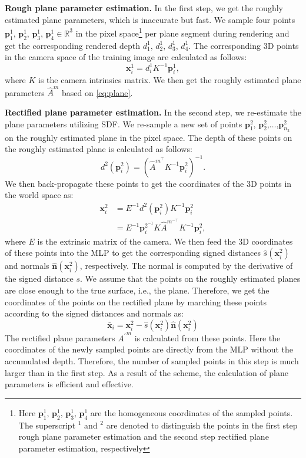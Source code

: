 \documentclass[10pt,journal,compsoc]{IEEEtran}
\begin{document}
	
	
	\noindent\textbf{Rough plane parameter estimation.} In the first step, we get the roughly estimated plane parameters, which is inaccurate but fast. We sample four points $\bm{p}^1_1\text{, }\bm{p}^1_2 \text{, } \bm{p}^1_3 \text{, } \bm{p}^1_4 \in \mathbb{R}^3$ in the pixel space\footnote{Here $\bm{p}^1_1\text{, }\bm{p}^1_2 \text{, } \bm{p}^1_3 \text{, } \bm{p}^1_4$ are the homogeneous coordinates of the sampled points. The superscript $^1$ and $^2$ are denoted to distinguish the points in the first step rough plane parameter estimation and the second step rectified plane parameter estimation, respectively} per plane segment during rendering and get the corresponding rendered depth $d^1_1\text{, }d^1_2\text{, }d^1_3\text{, } d^1_4$. The corresponding 3D points in the camera space of the training image are calculated as follows:
	\begin{equation}
		\bm{x}^1_i=d^1_i K^{-1} \bm{p}^1_i,
	\end{equation}
	where $K$ is the camera intrinsics matrix. We then get the roughly estimated plane parameters $\hat{A}^m$ based on \cref{eq:plane}.
	
	\noindent\textbf{Rectified plane parameter estimation.} In the second step, we re-estimate the plane parameters utilizing SDF. We re-sample a new set of points $\bm{p}^2_1\text{, }\bm{p}^2_2\text{,} \dots\text{,} \bm{p}^2_{n_2}$ on the roughly estimated plane in the pixel space. The depth of these points on the roughly estimated plane is calculated as follows:
	\begin{equation}
		d^2\left(\bm{p}^2_i\right)=\left(\hat{A}^{m^{\scriptstyle\top}} K^{-1} \bm{p}^2_i\right)^{-1}.
	\end{equation}
	We then back-propagate these points to get the coordinates of the 3D points in the world space as:
	\begin{align}
		\bm{x}^2_i &= E^{-1}d^2(\bm{p}^2_i)K^{-1}\bm{p}^2_i\\
		&=E^{-1}\bm{p}_i^{2^{\scriptstyle-1}}K{\hat{A}^{m^{\scriptstyle{-\!\!\top}}}}K^{-1}\bm{p}^2_i,
	\end{align}
	where $E$ is the extrinsic matrix of the camera. We then feed the 3D coordinates of these points into the MLP to get the corresponding signed distances $\hat{s}(\bm{x}^2_i)$ and normals $\hat{\bm{n}}(\bm{x}^2_i)$, respectively. The normal is computed by the derivative of the signed distance $s$. We assume that the points on the roughly estimated planes are close enough to the true surface, i.e., the plane. Therefore, we get the coordinates of the points on the rectified plane by marching these points according to the signed distances and normals as:
	\begin{equation}
		\bm{\bar{x}}_{i} = \bm{x}^2_i - \hat{s}(\bm{x}^2_i)\hat{\bm{n}}(\bm{x}^2_i)
	\end{equation}
	The rectified plane parameters ${A^\prime}^m$ is calculated from these points. Here the coordinates of the newly sampled points are directly from the MLP without the accumulated depth. Therefore, the number of sampled points in this step is much larger than in the first step. As a result of the scheme, the calculation of plane parameters is efficient and effective.
\end{document}
